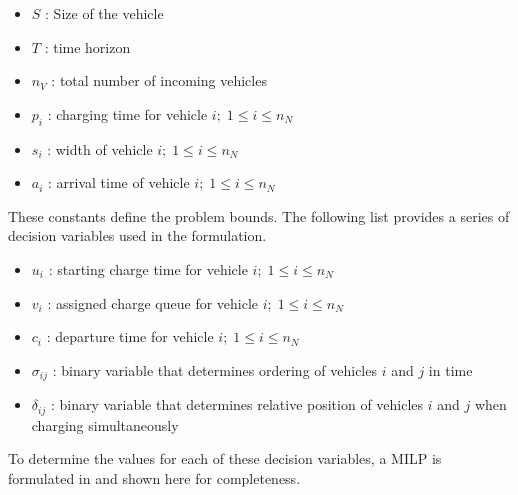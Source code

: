 \begin{itemize}
	\item $S$   : Size of the vehicle
	\item $T$   : time horizon
	\item $n_V$ : total number of incoming vehicles
	\item $p_i$ : charging time for vehicle $i;\; 1 \leq i \leq n_N$
	\item $s_i$ : width of vehicle $i;\; 1 \leq i \leq n_N$
	\item $a_i$ : arrival time of vehicle $i;\; 1 \leq i \leq n_N$
\end{itemize}

These constants define the problem bounds. The following list provides a series of decision variables used in the
formulation.

\begin{itemize}
    \item $u_i$    : starting charge time for vehicle $i;\; 1 \leq i \leq n_N$
    \item $v_i$    : assigned charge queue for vehicle $i;\; 1 \leq i \leq n_N$
    \item $c_i$    : departure time for vehicle $i;\; 1 \leq i \leq n_N$
    \item $\sigma_{ij}$ : binary variable that determines ordering of vehicles $i$ and $j$ in time
    \item $\delta_{ij}$ : binary variable that determines relative position of vehicles $i$ and $j$ when charging simultaneously
\end{itemize}

To determine the values for each of these decision variables, a MILP is formulated in \cite{Qarebagh2019} and shown
here for completeness.


